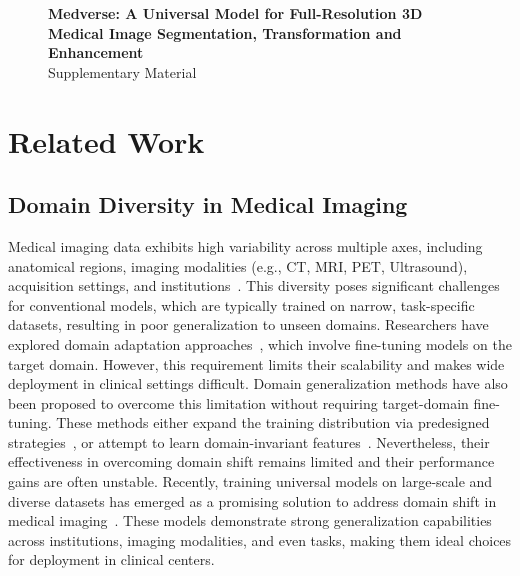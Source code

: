 \clearpage
\onecolumn



\begin{figure}[t]
\centering
\Large 
\textbf{Medverse: A Universal Model for Full-Resolution 3D Medical Image Segmentation, Transformation and Enhancement} \\[0.5em]
Supplementary Material \\[1.0em]
\end{figure}

\section{Related Work}
\label{sec:related}

\subsection{Domain Diversity in Medical Imaging}

Medical imaging data exhibits high variability across multiple axes, including anatomical regions, imaging modalities (e.g., CT, MRI, PET, Ultrasound), acquisition settings, and institutions~\cite{bell2022harmonization, zhang2020generalizing}. This diversity poses significant challenges for conventional models, which are typically trained on narrow, task-specific datasets, resulting in poor generalization to unseen domains. Researchers have explored domain adaptation approaches~\cite{wang2023fvp, hu2024chebyshev}, which involve fine-tuning models on the target domain. However, this requirement limits their scalability and makes wide deployment in clinical settings difficult. Domain generalization methods have also been proposed to overcome this limitation without requiring target-domain fine-tuning. These methods either expand the training distribution via predesigned strategies~\cite{zhang2020generalizing, ouyang2022causality}, or attempt to learn domain-invariant features~\cite{hu2022domain, ilse2020diva}. Nevertheless, their effectiveness in overcoming domain shift remains limited and their performance gains are often unstable. Recently, training universal models on large-scale and diverse datasets has emerged as a promising solution to address domain shift in medical imaging~\cite{butoi2023universeg, ma2024segment, hu2025building}. These models demonstrate strong generalization capabilities across institutions, imaging modalities, and even tasks, making them ideal choices for deployment in clinical centers.


